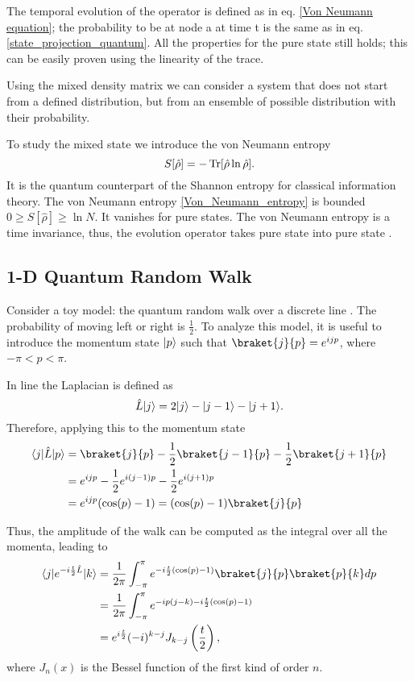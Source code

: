 The temporal evolution of the operator is defined as in eq. \eqref{Von Neumann equation}; the probability to be at node a at time t is the same as in eq. \eqref{state_projection_quantum}. All the properties for the pure state still holds; this can be easily proven using the linearity of the trace.

Using the mixed density matrix we can consider a system that does not start from a defined distribution, but from an ensemble of possible distribution with their probability. 

To study the mixed state we introduce the von Neumann entropy
\begin{equation}\label{Von_Neumann_entropy}
    S[\hat\rho]=-\operatorname{Tr}[\hat\rho\ln\hat\rho].
\end{equation}
It is the quantum counterpart of the Shannon entropy for classical information theory.
The von Neumann entropy \eqref{Von_Neumann_entropy} is bounded $0\geq S[\hat\rho] \geq \ln N$. It vanishes for pure states.
The von Neumann entropy is a time invariance, thus, the evolution operator takes pure state into pure state \cite{Nielsen_Chuang_2010}.


\subsection{1-D Quantum Random Walk}
Consider a toy model: the quantum random walk over a discrete line \cite{Farhi_98}. The probability of moving left or right is $\frac{1}{2}$.
To analyze this model, it is useful to introduce the momentum state $\lvert p\rangle$ such that $\braket{j}{p} = e^{ijp}$, where $-\pi < p< \pi$.

In line the Laplacian is defined as
\begin{equation}
    \hat L \lvert j\rangle = 2\lvert j\rangle -\lvert j-1\rangle -\lvert j+1\rangle . 
\end{equation}
Therefore, applying this to the momentum state
\begin{equation}
    \begin{split}
        \bra{j}\hat L \ket{p} &= \braket{j}{p} -\frac{1}{2}\braket{j-1}{p} -\frac{1}2{}\braket{j+1}{p}\\
        &= e^{ijp} -\frac{1}{2}e^{i(j-1)p} - \frac{1}{2}e^{i(j+1)p}\\
        &= e^{ijp}(\cos(p) - 1) = (\cos(p) - 1)\braket{j}{p}
    \end{split}
\end{equation}

Thus, the amplitude of the walk can be computed as the integral over all the momenta, leading to
\begin{equation}
    \begin{split}
        \bra{j}e^{-i\frac{t}{2}\hat L} \ket{k}&= \frac{1}{2\pi}\int_{-\pi}^{\pi} e^{-i\frac{t}{2}(\cos(p) - 1)} \braket{j}{p} \braket{p}{k} dp\\
        &= \frac{1}{2\pi}\int_{-\pi}^{\pi} e^{-ip(j-k)-i\frac{t}{2}(\cos(p) - 1)}\\
        & = e^{i\frac{t}{2}}(-i)^{k-j}J_{k-j}\left(\frac{t}{2}\right),
   \end{split}
\end{equation}
where $J_{n}(x)$ is the Bessel function of the first kind of order $n$.

